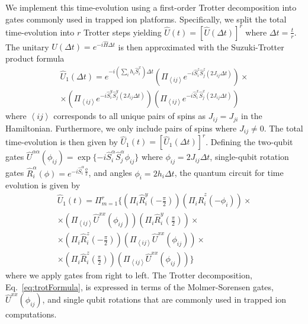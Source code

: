 \documentclass[prx,aps,twocolumn,showpacs,superscriptaddress,10pt]{revtex4-1}
\begin{document}
We implement this time-evolution using a first-order Trotter decomposition into gates commonly used in trapped ion platforms. Specifically, we split the total
time-evolution into $r$ Trotter steps yielding $\hat{U}\left(t\right)=\left[\hat{U}\left(\Delta t\right)\right]^{r}$
where $\Delta t=\frac{t}{r}$. The unitary $\hat{U}\left(\Delta t\right)=e^{-i\hat{H}\Delta t}$
is then approximated with the Suzuki-Trotter product formula
\begin{multline}
\hat{U}_{1}\left(\Delta t\right) =e^{-i\left(\sum_{i}h_{i}\hat{S}_{i}^{x}\right)\Delta t}\left(\Pi_{\left\langle ij\right\rangle }e^{-i\hat{S}_{i}^{z}\hat{S}_{j}^{z}\left(2J_{ij}\Delta t\right)}\right)\times\\
\times\left(\Pi_{\left\langle ij\right\rangle }e^{-i\hat{S}_{i}^{y}\hat{S}_{j}^{y}\left(2J_{ij}\Delta t\right)}\right)\left(\Pi_{\left\langle ij\right\rangle }e^{-i\hat{S}_{i}^{x}\hat{S}_{j}^{x}\left(2J_{ij}\Delta t\right)}\right)
\end{multline}
where $\left\langle ij\right\rangle $ corresponds to all unique pairs
of spins as $J_{ij}=J_{ji}$ in the Hamiltonian. Furthermore, we only
include pairs of spins where $J_{ij}\neq0$. The total time-evolution
is then given by $\hat{U}_{1}\left(t\right)=\left[\hat{U}_{1}\left(\Delta t\right)\right]^{r}$.
Defining the two-qubit gates $\hat{U}^{\alpha\alpha}\left(\phi_{ij}\right)= \exp\{-i\hat{S}_{i}^{\alpha}\hat{S}_{j}^{\alpha}\phi_{ij}\}$
where $\phi_{ij}=2J_{ij}\Delta t$, single-qubit rotation gates
$\hat{R}_{i}^{\alpha}\left(\phi\right)=e^{-i\hat{S}_{i}^{\alpha}\frac{\phi}{2}}$,
and angles $\phi_{i}=2h_{i}\Delta t$, the quantum circuit for
time evolution is given by 
\begin{multline}\label{eq:trotFormula}
\hat{U}_{1}\left(t\right) =\Pi_{m=1}^{r}\{
\left(\Pi_{i}\hat{R}_{i}^{y}\left(-\frac{\pi}{2}\right)\right)\left(\Pi_{i}\hat{R}_{i}^{z}\left(-\phi_{i}\right)\right)\times\\
\times\left(\Pi_{\left\langle ij\right\rangle }\hat{U}^{xx}\left(\phi_{ij}\right)\right)\left(\Pi_{i}\hat{R}_{i}^{y}\left(\frac{\pi}{2}\right)\right) \times\\
\times\left(\Pi_{i}\hat{R}_{i}^{z}\left(-\frac{\pi}{2}\right)\right)\left(\Pi_{\left\langle ij\right\rangle }\hat{U}^{xx}\left(\phi_{ij}\right)\right)\times\\
\times\left(\Pi_{i}\hat{R}_{i}^{z}\left(\frac{\pi}{2}\right)\right)
\left(\Pi_{\left\langle ij\right\rangle }\hat{U}^{xx}\left(\phi_{ij}\right)\right)\}
\end{multline}
where we apply gates from right to left. The Trotter decomposition, Eq.~\eqref{eq:trotFormula}, is expressed in terms of the Molmer-Sorensen gates, $\hat{U}^{xx}\left(\phi_{ij}\right)$, and single qubit rotations that are commonly used in trapped ion computations.
\end{document}
